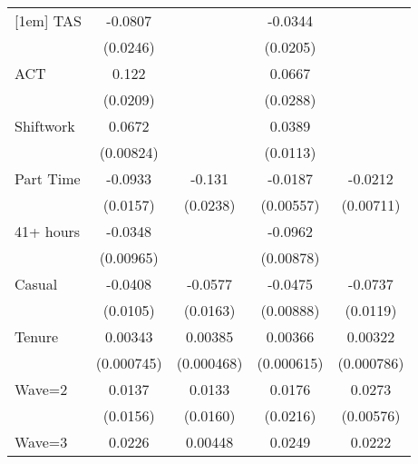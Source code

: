{\begin{tabular}{l*{4}{c}}
[1em]
TAS                 &     -0.0807\sym{**} &                     &     -0.0344         &                     \\
                    &    (0.0246)         &                     &    (0.0205)         &                     \\
[1em]
ACT                 &       0.122\sym{***}&                     &      0.0667\sym{*}  &                     \\
                    &    (0.0209)         &                     &    (0.0288)         &                     \\
[1em]
Shiftwork           &      0.0672\sym{***}&                     &      0.0389\sym{***}&                     \\
                    &   (0.00824)         &                     &    (0.0113)         &                     \\
[1em]
Part Time           &     -0.0933\sym{***}&      -0.131\sym{***}&     -0.0187\sym{***}&     -0.0212\sym{**} \\
                    &    (0.0157)         &    (0.0238)         &   (0.00557)         &   (0.00711)         \\
[1em]
41+ hours           &     -0.0348\sym{***}&                     &     -0.0962\sym{***}&                     \\
                    &   (0.00965)         &                     &   (0.00878)         &                     \\
[1em]
Casual              &     -0.0408\sym{***}&     -0.0577\sym{***}&     -0.0475\sym{***}&     -0.0737\sym{***}\\
                    &    (0.0105)         &    (0.0163)         &   (0.00888)         &    (0.0119)         \\
[1em]
Tenure              &     0.00343\sym{***}&     0.00385\sym{***}&     0.00366\sym{***}&     0.00322\sym{***}\\
                    &  (0.000745)         &  (0.000468)         &  (0.000615)         &  (0.000786)         \\
[1em]
Wave=2              &      0.0137         &      0.0133         &      0.0176         &      0.0273\sym{***}\\
                    &    (0.0156)         &    (0.0160)         &    (0.0216)         &   (0.00576)         \\
[1em]
Wave=3              &      0.0226         &     0.00448         &      0.0249         &      0.0222         \\

\end{tabular}}
